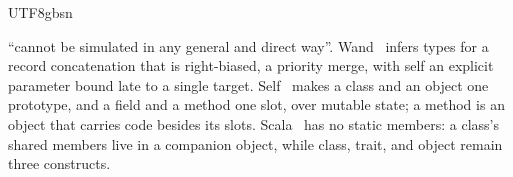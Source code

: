 \begin{CJK*}{UTF8}{gbsn}
\begin{sloppypar}
``cannot be simulated in any general and direct way''.
Wand~\cite{wand1991-record-concatenation-inference} infers types for a
record concatenation that is right-biased, a priority merge, with self an explicit parameter bound
late to a single target.
Self~\cite{ungar1987-self-language} makes a class and an object one
prototype, and a field and a method one slot, over mutable state;
a method is an object that carries code besides its slots.
Scala~\cite{odersky2004-scala-overview} has no static members: a
class's shared members live in a companion object, while class,
trait, and object remain three constructs.
\end{sloppypar}
\fi

\paragraph{}
\ifPaperChinese

\end{CJK*}
